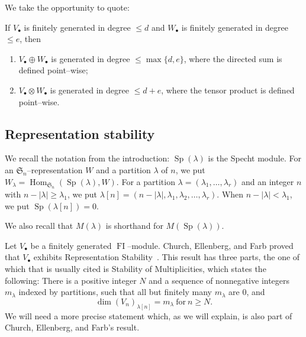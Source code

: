\documentclass[ALCO,ThmDefs,Unicode,epreuves]{cedram}
\DeclareMathOperator{\FI}{FI}
\DeclareMathOperator{\Hom}{Hom}
\DeclareMathOperator{\Sp}{Sp}
\newcommand{\Sn}{\mathfrak{S}}
\newcommand{\dt}{\bullet}
\begin{document}
We take the opportunity to quote:
\begin{proposition}\label{tensorgen}
If $V_\dt$ is finitely generated in degree $\leq d$ and $W_\dt$ is finitely generated in degree $\leq e$, then
\begin{enumerate}
\item\label{prop2.7_1} $V_\dt \oplus W_\dt$ is generated in degree $\leq \max\{d,e\}$, where the directed sum is defined point--wise;
\item\label{prop2.7_2} $V_\dt \otimes W_\dt$ is generated in degree $\leq d+e$, where the tensor product is defined point--wise.
\end{enumerate}
\end{proposition}


\subsection{Representation stability} \label{defineLambdaComponent}

We recall the notation from the introduction: $\Sp(\lambda)$ is the Specht module. For an $\Sn_n$--representation $W$ and a partition $\lambda$ of $n$, we put $W_{\lambda} = \Hom_{\Sn_n}(\Sp(\lambda), W)$. For a partition $\lambda=(\lambda_1, \ldots, \lambda_r)$ and an integer $n$ with $n-|\lambda| \geq \lambda_1$, we put $\lambda[n] = (n-|\lambda|, \lambda_1, \lambda_2, \ldots, \lambda_r)$. When $n-|\lambda| < \lambda_1$, we put $\Sp(\lambda[n]) = 0$. 

We also recall that $M(\lambda)$ is shorthand for $M(\Sp(\lambda))$.

Let $V_{\dt}$ be a finitely generated $\FI$--module. Church, Ellenberg, and Farb proved that $V_{\dt}$ exhibits Representation Stability~\cite[Theorem~1.13]{CEF}. This result has three parts, the one of which that is usually cited is Stability of Multiplicities, which states the following: There is a positive integer $N$ and a sequence of nonnegative integers $m_{\lambda}$ indexed by partitions, such that all but finitely many $m_{\lambda}$ are $0$, and
\[ \dim (V_n)_{\lambda[n]} = m_{\lambda} \ \mbox{for}\ n \geq N . \]
We will need a more precise statement which, as we will explain, is also part of Church, Ellenberg, and Farb's result.
\end{document}
